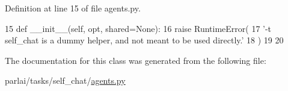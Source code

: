 Definition at line 15 of file agents.\+py.


\begin{DoxyCode}
15     \textcolor{keyword}{def }\_\_init\_\_(self, opt, shared=None):
16         \textcolor{keywordflow}{raise} RuntimeError(
17             \textcolor{stringliteral}{'-t self\_chat is a dummy helper, and not meant to be used directly.'}
18         )
19 
20 
\end{DoxyCode}


The documentation for this class was generated from the following file\+:\begin{DoxyCompactItemize}
\item 
parlai/tasks/self\+\_\+chat/\hyperlink{parlai_2tasks_2self__chat_2agents_8py}{agents.\+py}\end{DoxyCompactItemize}
